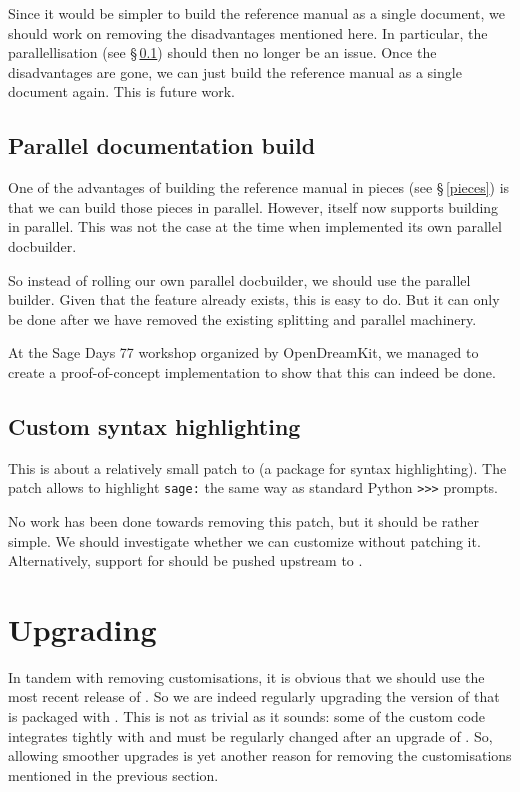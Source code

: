 \documentclass{deliverablereport}
\begin{document}
Since it would be simpler to build the reference manual as a single document,
we should work on removing the disadvantages mentioned here.
In particular, the parallellisation (see \S\,\ref{parallel})
should then no longer be an issue.
Once the disadvantages are gone, we can just build the reference manual
as a single document again.
This is future work.

\subsection{Parallel documentation build}\label{parallel}

One of the advantages of building the reference manual in pieces
(see \S\,\ref{pieces}) is that we can build those pieces in parallel.
However, \Sphinx itself now supports building in parallel.
This was not the case at the time when \Sage
implemented its own parallel docbuilder.

So instead of rolling our own parallel docbuilder,
we should use the \Sphinx parallel builder.
Given that the feature already exists, this is easy to do.
But it can only be done after we have removed the existing
splitting and parallel machinery.

At the Sage Days 77 workshop organized by OpenDreamKit,
we managed to create a proof-of-concept implementation
to show that this can indeed be done.

\subsection{Custom syntax highlighting}

This is about a relatively small patch to \Pygments
(a package for syntax highlighting).
The patch allows to highlight \texttt{sage:} the same way
as standard Python \texttt{>>>} prompts.

No work has been done towards removing this patch,
but it should be rather simple.
We should investigate whether we can customize \Pygments without
patching it.
Alternatively, support for \Sage should be pushed upstream to \Pygments.

\section{Upgrading \Sphinx}

In tandem with removing customisations, it is obvious that we
should use the most recent release of \Sphinx.
So we are indeed regularly upgrading the version of \Sphinx
that is packaged with \Sage.
This is not as trivial as it sounds:
some of the custom code integrates tightly with \Sphinx
and must be regularly changed after an upgrade of \Sphinx.
So, allowing smoother upgrades is yet another reason for
removing the customisations mentioned in the previous section.
\end{document}
